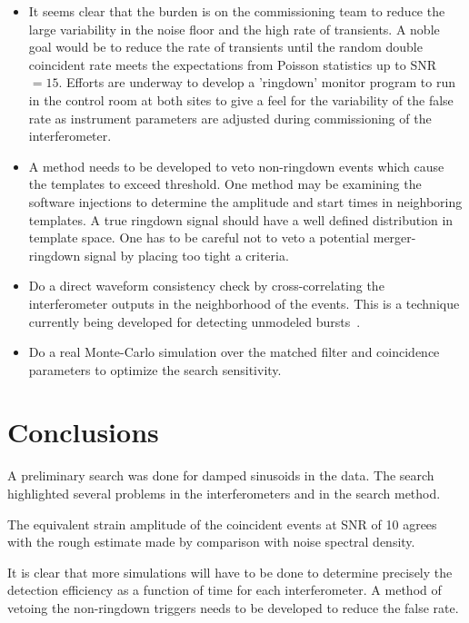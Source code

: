 \begin{itemize}

\item It seems clear that the burden is on the commissioning team to
      reduce the large variability in the noise floor and the high rate 
      of transients. A noble goal would be to reduce the rate of transients
      until the random double coincident rate meets the expectations from
      Poisson statistics up to SNR$= 15$. Efforts are underway to develop 
      a 'ringdown' monitor
      program to run in the control room at both sites to give a feel for
      the variability of the false rate as instrument parameters are adjusted
      during commissioning of the interferometer.

\item A method needs to be developed to veto non-ringdown events which cause
      the templates to exceed threshold. One method may be examining the software 
      injections to determine the amplitude and start times in neighboring
      templates\cite{Jolien:40m}. A true ringdown signal should have a well 
      defined distribution
      in template space. One has to be careful not to veto a potential
      merger-ringdown signal by placing too tight a criteria.

\item Do a direct waveform consistency check by cross-correlating the
      interferometer outputs in the neighborhood of the events. This is
      a technique currently being developed for detecting unmodeled 
      bursts~\cite{Laura:Rstat}.

\item Do a real Monte-Carlo simulation over the matched filter and 
      coincidence parameters to optimize the search sensitivity.

\end{itemize} 


\section{Conclusions}

A preliminary search was done for damped sinusoids in the data. The search
highlighted several problems in the interferometers and in the search method.

The equivalent strain amplitude of the coincident events at SNR of 10
agrees with the rough estimate made by comparison with noise spectral density.

It is clear that more simulations will have to be done to determine precisely
the detection efficiency as a function of time for each interferometer. A method
of vetoing the non-ringdown triggers needs to be developed to reduce the
false rate.






